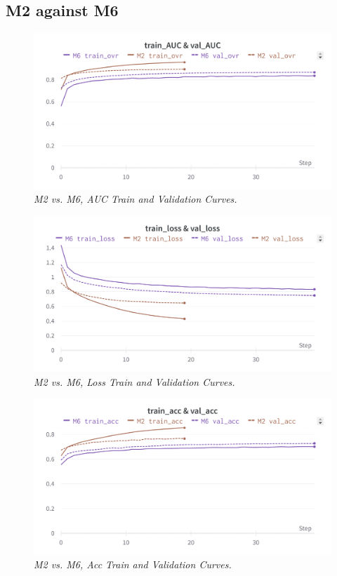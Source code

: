 \subsection{M2 against M6}

\begin{figure}[H]
  \centering
  \includegraphics[width=\textwidth]{imatges/results/AUCM2M6.png}
  \caption[M2 vs. M6, AUC Train and Validation Curves]{\textit{M2 vs. M6, AUC Train and Validation Curves. }}
\end{figure}

\newpage

\begin{figure}[H]
  \centering
  \includegraphics[width=\textwidth]{imatges/results/LossM2M6.png}
  \caption[M2 vs. M6, Loss Train and Validation Curves]{\textit{M2 vs. M6, Loss Train and Validation Curves. }}
\end{figure}


\begin{figure}[H]
  \centering
  \includegraphics[width=\textwidth]{imatges/results/AccM2M6.png}
  \caption[M2 vs. M6, Acc Train and Validation Curves]{\textit{M2 vs. M6, Acc Train and Validation Curves. }}
\end{figure}

